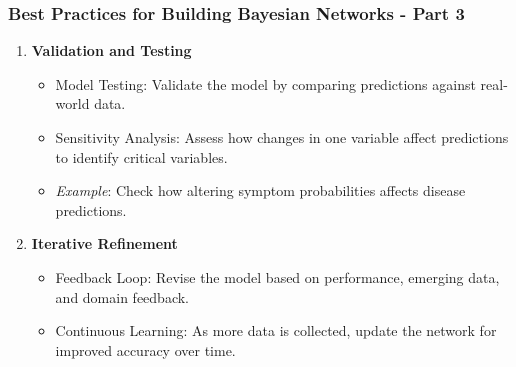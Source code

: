 \documentclass[aspectratio=169]{beamer}
\begin{document}
\begin{frame}[fragile]
    \frametitle{Best Practices for Building Bayesian Networks - Part 3}
    \begin{enumerate}[start=5]
        \item \textbf{Validation and Testing}
        \begin{itemize}
            \item Model Testing: Validate the model by comparing predictions against real-world data.
            \item Sensitivity Analysis: Assess how changes in one variable affect predictions to identify critical variables.
            \item \textit{Example}: Check how altering symptom probabilities affects disease predictions.
        \end{itemize}
        
        \item \textbf{Iterative Refinement}
        \begin{itemize}
            \item Feedback Loop: Revise the model based on performance, emerging data, and domain feedback.
            \item Continuous Learning: As more data is collected, update the network for improved accuracy over time.
        \end{itemize}
    \end{enumerate}
\end{frame}
\end{document}
